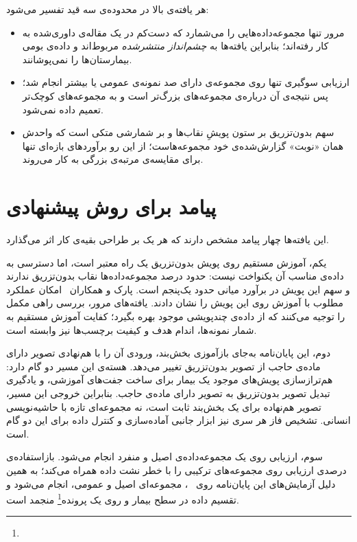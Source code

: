 هر یافته‌ی بالا در محدوده‌ی سه قید تفسیر می‌شود:

\begin{itemize}
\item مرور تنها مجموعه‌داده‌هایی را می‌شمارد که دست‌کم در یک مقاله‌ی داوری‌شده به کار رفته‌اند؛ بنابراین یافته‌ها به \emph{چشم‌انداز منتشرشده} مربوط‌اند و داده‌ی بومی بیمارستان‌ها را نمی‌پوشانند.
\item ارزیابی سوگیری تنها روی  مجموعه‌ی دارای صد نمونه‌ی عمومی یا بیشتر انجام شد؛ پس نتیجه‌ی آن درباره‌ی مجموعه‌های بزرگ‌تر است و به مجموعه‌های کوچک‌تر تعمیم داده نمی‌شود.
\item سهم بدون‌تزریق بر ستون پویشِ نقاب‌ها و بر شمارشی متکی است که واحدش همان «نوبت» گزارش‌شده‌ی خود مجموعه‌هاست؛ از این رو برآوردهای بازه‌ای تنها برای مقایسه‌ی مرتبه‌ی بزرگی به کار می‌روند.
\end{itemize}

\section{پیامد برای روش پیشنهادی}
\label{sec:s-implications}

این یافته‌ها چهار پیامد مشخص دارند که هر یک بر طراحی بقیه‌ی کار اثر می‌گذارد.

یکم، آموزش مستقیم روی پویش بدون‌تزریق یک راه معتبر است، اما دسترسی به داده‌ی مناسب آن یکنواخت نیست: حدود  درصد مجموعه‌داده‌ها نقاب بدون‌تزریق ندارند و سهم این پویش در برآورد میانی حدود یک‌پنجم است. پارک و همکاران~\cite{park2025nect} امکان عملکرد مطلوب با آموزش روی این پویش را نشان دادند. یافته‌های مرور، بررسی راهی مکمل را توجیه می‌کنند که از داده‌ی چندپویشی موجود بهره بگیرد؛ کفایت آموزش مستقیم به شمار نمونه‌ها، اندام هدف و کیفیت برچسب‌ها نیز وابسته است.

دوم، این پایان‌نامه به‌جای بازآموزی بخش‌بند، ورودی آن را با هم‌نهادی تصویر دارای ماده‌ی حاجب از تصویر بدون‌تزریق تغییر می‌دهد. هسته‌ی این مسیر دو گام دارد: هم‌ترازسازی پویش‌های موجود یک بیمار برای ساخت جفت‌های آموزشی، و یادگیری تبدیل تصویر بدون‌تزریق به تصویر دارای ماده‌ی حاجب. بنابراین خروجی این مسیر، تصویر هم‌نهاده برای یک بخش‌بند ثابت است، نه مجموعه‌ای تازه با حاشیه‌نویسی انسانی. تشخیص فاز هر سری نیز ابزار جانبی آماده‌سازی و کنترل داده برای این دو گام است.

سوم، ارزیابی روی یک مجموعه‌داده‌ی اصیل و منفرد انجام می‌شود. بازاستفاده‌ی  درصدی ارزیابی روی مجموعه‌های ترکیبی را با خطر نشت داده همراه می‌کند؛ به همین دلیل آزمایش‌های این پایان‌نامه روی ~\cite{zhou2021phaserecog}، مجموعه‌ای اصیل و عمومی، انجام می‌شود و تقسیم داده در سطح بیمار و روی یک پرونده\footnote{} منجمد است.

